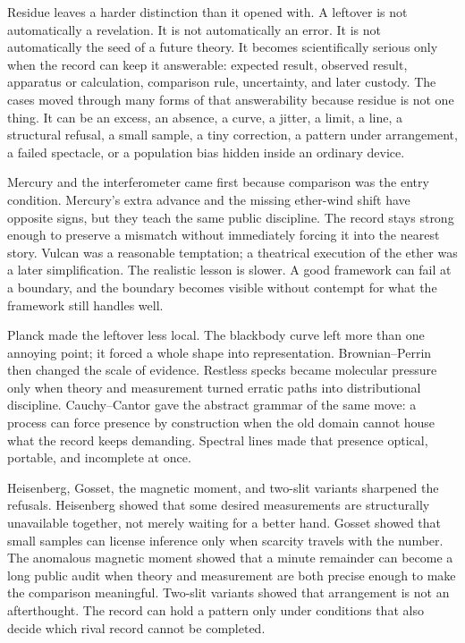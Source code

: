 \begin{movementclose}
Residue leaves a harder distinction than it opened with. A leftover is not
automatically a revelation. It is not automatically an error. It is not
automatically the seed of a future theory. It becomes scientifically serious
only when the record can keep it answerable: expected result, observed
result, apparatus or calculation, comparison rule, uncertainty, and later
custody. The cases moved through many forms of that answerability because
residue is not one thing. It can be an excess, an absence, a curve, a
jitter, a limit, a line, a structural refusal, a small sample, a tiny
correction, a pattern under arrangement, a failed spectacle, or a population
bias hidden inside an ordinary device.

Mercury and the interferometer came first because comparison was the entry
condition. Mercury's extra advance and the missing ether-wind shift have
opposite signs, but they teach the same public discipline. The record stays
strong enough to preserve a mismatch without immediately forcing it into the
nearest story. Vulcan was a reasonable temptation; a theatrical execution of
the ether was a later simplification. The realistic lesson is slower. A
good framework can fail at a boundary, and the boundary becomes visible
without contempt for what the framework still handles well.

Planck made the leftover less local. The blackbody curve left more than one
annoying point; it forced a whole shape into representation.
Brownian--Perrin then changed the scale of evidence. Restless specks became
molecular pressure only when theory and measurement turned erratic paths
into distributional discipline. Cauchy--Cantor gave the abstract grammar of
the same move: a process can force presence by construction when the old
domain cannot house what the record keeps demanding. Spectral lines made
that presence optical, portable, and incomplete at once.

Heisenberg, Gosset, the magnetic moment, and two-slit variants sharpened the
refusals. Heisenberg showed that some desired measurements are structurally
unavailable together, not merely waiting for a better hand. Gosset showed
that small samples can license inference only when scarcity travels with the
number. The anomalous magnetic moment showed that a minute remainder can
become a long public audit when theory and measurement are both precise
enough to make the comparison meaningful. Two-slit variants showed that
arrangement is not an afterthought. The record can hold a pattern only
under conditions that also decide which rival record cannot be completed.


\end{movementclose}

